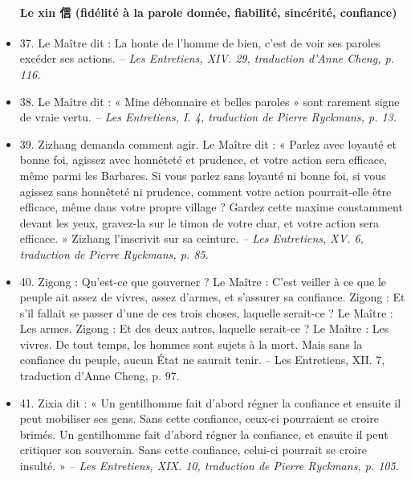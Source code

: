 \begin{itemize}
\paragraph{Le xin 信 (fidélité à la parole donnée, fiabilité, sincérité, confiance)}  
\item 37. \newline Le Maître dit : La honte de l’homme de bien, c’est de voir ses paroles excéder ses actions. \textit{\small  -- Les Entretiens, XIV. 29, traduction d’Anne Cheng, p. 116.  }
\item 38. \newline Le Maître dit : « Mine débonnaire et belles paroles » sont rarement signe de vraie vertu.  \textit{\small -- Les Entretiens, I. 4, traduction de Pierre Ryckmans, p. 13.  }
\item 39. \newline Zizhang demanda comment agir. \newline Le Maître dit : « Parlez avec loyauté et bonne foi, agissez avec honnêteté et prudence, et votre action sera efficace, même parmi les Barbares. Si vous parlez sans loyauté ni bonne foi, si vous agissez sans honnêteté ni prudence, comment votre action pourrait-elle être efficace, même dans votre propre village ? Gardez cette maxime constamment devant les yeux, gravez-la sur le timon de votre char, et votre action sera efficace. » \newline Zizhang l’inscrivit sur sa ceinture.  \textit{\small -- Les Entretiens, XV. 6, traduction de Pierre Ryckmans, p. 85.  }
\item 40. \newline Zigong : Qu’est-ce que gouverner ? \newline Le Maître : C’est veiller à ce que le peuple ait assez de vivres, assez d’armes, et s’assurer sa confiance. \newline Zigong : Et s’il fallait se passer d’une de ces trois choses, laquelle serait-ce ? \newline Le Maître : Les armes. \newline Zigong : Et des deux autres, laquelle serait-ce ? \newline Le Maître : Les vivres. De tout temps, les hommes sont sujets à la mort. Mais sans la confiance du peuple, aucun État ne saurait tenir. -- Les Entretiens, XII. 7, traduction d’Anne Cheng, p. 97.  
\item 41. \newline Zixia dit : « Un gentilhomme fait d’abord régner la confiance et ensuite il peut mobiliser ses gens. Sans cette confiance, ceux-ci pourraient se croire brimés. Un gentilhomme fait d’abord régner la confiance, et ensuite il peut critiquer son souverain. Sans cette confiance, celui-ci pourrait se croire insulté. » \textit{\small -- Les Entretiens, XIX. 10, traduction de Pierre Ryckmans, p. 105. }

 
\end{itemize}

